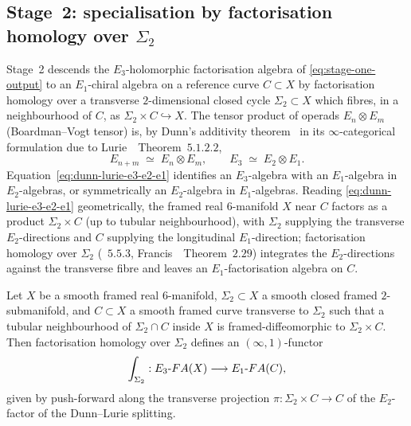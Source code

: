 \subsection{Stage~2: specialisation by factorisation homology over
$\Sigma_2$}
\label{subsec:fa-stage-two}

Stage~2 descends the $E_3$-holomorphic factorisation algebra of
\eqref{eq:stage-one-output} to an $E_1$-chiral algebra on a reference
curve $C \subset X$ by factorisation homology over a transverse
$2$-dimensional closed cycle $\Sigma_2 \subset X$ which fibres, in a
neighbourhood of $C$, as $\Sigma_2 \times C \hookrightarrow X$. The
tensor product of operads $E_n \otimes E_m$ (Boardman--Vogt tensor) is,
by Dunn's additivity theorem~\cite{Dunn1988} in its $\infty$-categorical
formulation due to Lurie~\cite{LurieHA}~Theorem~$5.1.2.2$,
\begin{equation}
\label{eq:dunn-lurie-e3-e2-e1}
  E_{n + m} \;\simeq\; E_n \otimes E_m,
  \qquad
  E_3 \;\simeq\; E_2 \otimes E_1.
\end{equation}
Equation~\eqref{eq:dunn-lurie-e3-e2-e1} identifies an $E_3$-algebra
with an $E_1$-algebra in $E_2$-algebras, or symmetrically an
$E_2$-algebra in $E_1$-algebras. Reading
\eqref{eq:dunn-lurie-e3-e2-e1} geometrically, the framed real
$6$-manifold $X$ near $C$ factors as a product $\Sigma_2 \times C$
(up to tubular neighbourhood), with $\Sigma_2$ supplying the transverse
$E_2$-directions and $C$ supplying the longitudinal $E_1$-direction;
factorisation homology over $\Sigma_2$
(\cite{LurieHA}~$5.5.3$, Francis~\cite{Francis2013}~Theorem~$2.29$)
integrates the $E_2$-directions against the transverse fibre and leaves
an $E_1$-factorisation algebra on $C$.

\begin{proposition}
\label{prop:fa-transverse-integration}
Let $X$ be a smooth framed real $6$-manifold, $\Sigma_2 \subset X$ a
smooth closed framed $2$-submanifold, and $C \subset X$ a smooth framed
curve transverse to $\Sigma_2$ such that a tubular neighbourhood of
$\Sigma_2 \cap C$ inside $X$ is framed-diffeomorphic to
$\Sigma_2 \times C$. Then factorisation homology over $\Sigma_2$
defines an $(\infty, 1)$-functor
\begin{equation}
\label{eq:sigma2-integration}
  \int_{\Sigma_2} : E_3\text{-}FA(X) \longrightarrow
  E_1\text{-}FA(C),
\end{equation}
given by push-forward along the transverse projection
$\pi \colon \Sigma_2 \times C \to C$ of the $E_2$-factor of the
Dunn--Lurie splitting.
\end{proposition}

